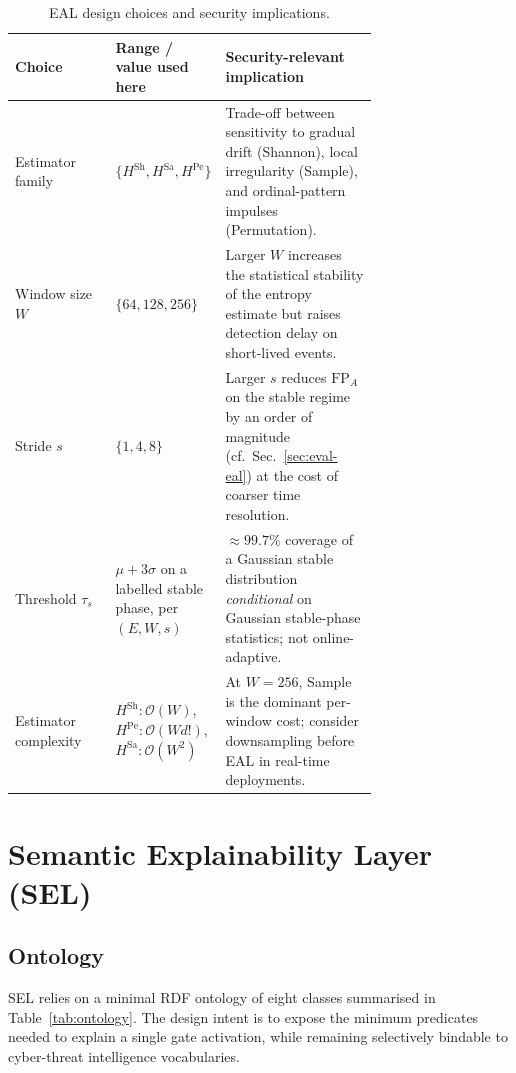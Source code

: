 \documentclass[runningheads]{llncs}
\newcommand{\Hsh}{\ensuremath{H^{\mathrm{Sh}}}}
\newcommand{\Hsa}{\ensuremath{H^{\mathrm{Sa}}}}
\newcommand{\Hpe}{\ensuremath{H^{\mathrm{Pe}}}}
\newcommand{\taus}{\ensuremath{\tau_{s}}}
\begin{document}
\begin{table}[t]
\centering
\caption{EAL design choices and security implications.}
\label{tab:eal-implications}
\small
\begin{tabular}{@{}lp{0.30\linewidth}p{0.42\linewidth}@{}}
\toprule
\textbf{Choice} & \textbf{Range / value used here} & \textbf{Security-relevant implication} \\
\midrule
Estimator family & $\{\Hsh, \Hsa, \Hpe\}$ & Trade-off between sensitivity
  to gradual drift (Shannon), local irregularity (Sample), and
  ordinal-pattern impulses (Permutation). \\
Window size $W$ & $\{64, 128, 256\}$ & Larger $W$ increases the
  statistical stability of the entropy estimate but raises detection
  delay on short-lived events. \\
Stride $s$ & $\{1, 4, 8\}$ & Larger $s$ reduces $\mathrm{FP}_A$ on the
  stable regime by an order of magnitude (cf.\ Sec.~\ref{sec:eval-eal})
  at the cost of coarser time resolution. \\
Threshold $\taus$ & $\mu + 3\sigma$ on a labelled stable phase, per
  $(E, W, s)$ & $\approx 99.7\%$ coverage of a Gaussian stable
  distribution \emph{conditional} on Gaussian stable-phase statistics;
  not online-adaptive. \\
Estimator complexity & $\Hsh\!:\mathcal{O}(W)$,
  $\Hpe\!:\mathcal{O}(W d!)$, $\Hsa\!:\mathcal{O}(W^{2})$ & At $W = 256$,
  Sample is the dominant per-window cost; consider downsampling before
  EAL in real-time deployments. \\
\bottomrule
\end{tabular}
\end{table}

\section{Semantic Explainability Layer (SEL)}
\label{sec:sel}

\subsection{Ontology}

SEL relies on a minimal RDF ontology of eight classes summarised in
Table~\ref{tab:ontology}. The design intent is to expose the minimum
predicates needed to explain a single gate activation, while remaining
selectively bindable to cyber-threat intelligence vocabularies.
\end{document}

